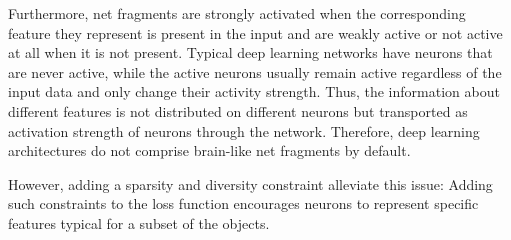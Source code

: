 Furthermore, net fragments are strongly activated when the corresponding feature they represent is present in the input and are weakly active or not active at all when it is not present.
Typical deep learning networks have neurons that are never active, while the active neurons usually remain active regardless of the input data and only change their activity strength.
Thus, the information about different features is not distributed on different neurons but transported as activation strength of neurons through the network.
Therefore, deep learning architectures do not comprise brain-like net fragments by default.

However, adding a sparsity and diversity constraint alleviate this issue:
Adding such constraints to the loss function encourages neurons to represent specific features typical for a subset of the objects.
